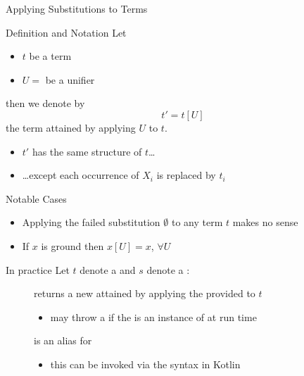 \documentclass[handout]{beamer}
\begin{document}
\begin{frame}[allowframebreaks]{Applying Substitutions to Terms}
    \begin{block}{Definition and Notation}
        Let
        \begin{itemize}
            \item $t$ be a term
            \item $U = $  be a unifier
        \end{itemize}
        then we denote by
        \[t' = t[U]\]
        the term attained by \alert{applying} $U$ to $t$.
        \begin{itemize}
            \item $t'$ has the same structure of $t$\ldots
            \item \ldots except each occurrence of $X_i$ is replaced by $t_i$
        \end{itemize}
    \end{block}

    \begin{alertblock}{Notable Cases}
        \begin{itemize}
            \item Applying the failed substitution $\emptyset$ to any term $t$ makes no sense
            \item If $x$ is \alert{ground} then $x[U] = x$, $\forall U$
        \end{itemize}
    \end{alertblock}

    \begin{block}{In practice}
        Let $t$ denote a  and $s$ denote a :
        \begin{description}
            \item[] returns a new  attained by applying the provided  to $t$
            \begin{itemize}\small
                \item may throw a \alert{} if the  is an instance of  at run time
            \end{itemize}

            \item[] is an alias for 
            \begin{itemize}
                \item this can be invoked via the syntax \alert{} in Kotlin
            \end{itemize}


\end{description}
\end{block}
\end{frame}
\end{document}
